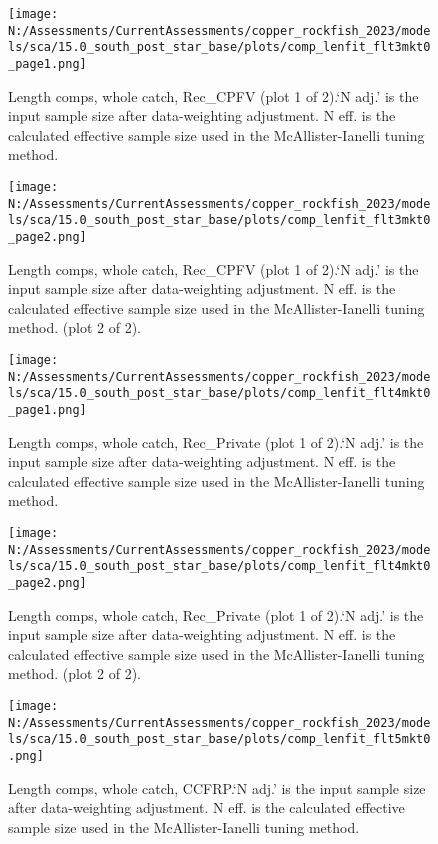 \documentclass[11pt,
  english,
  letterpaper,
]{article}
\begin{document}
\begin{figure}
\centering
\texttt{[image: N:/Assessments/CurrentAssessments/copper\_rockfish\_2023/models/sca/15.0\_south\_post\_star\_base/plots/comp\_lenfit\_flt3mkt0\_page1.png]}
\caption{Length comps, whole catch, Rec\_CPFV (plot 1 of 2).`N adj.' is the input sample size after data-weighting adjustment. N eff. is the calculated effective sample size used in the McAllister-Ianelli tuning method.\label{fig:comp_lenfit_flt3mkt0_page1}}
\end{figure}

\begin{figure}
\centering
\texttt{[image: N:/Assessments/CurrentAssessments/copper\_rockfish\_2023/models/sca/15.0\_south\_post\_star\_base/plots/comp\_lenfit\_flt3mkt0\_page2.png]}
\caption{Length comps, whole catch, Rec\_CPFV (plot 1 of 2).`N adj.' is the input sample size after data-weighting adjustment. N eff. is the calculated effective sample size used in the McAllister-Ianelli tuning method. (plot 2 of 2).\label{fig:comp_lenfit_flt3mkt0_page2}}
\end{figure}

\begin{figure}
\centering
\texttt{[image: N:/Assessments/CurrentAssessments/copper\_rockfish\_2023/models/sca/15.0\_south\_post\_star\_base/plots/comp\_lenfit\_flt4mkt0\_page1.png]}
\caption{Length comps, whole catch, Rec\_Private (plot 1 of 2).`N adj.' is the input sample size after data-weighting adjustment. N eff. is the calculated effective sample size used in the McAllister-Ianelli tuning method.\label{fig:comp_lenfit_flt4mkt0_page1}}
\end{figure}

\begin{figure}
\centering
\texttt{[image: N:/Assessments/CurrentAssessments/copper\_rockfish\_2023/models/sca/15.0\_south\_post\_star\_base/plots/comp\_lenfit\_flt4mkt0\_page2.png]}
\caption{Length comps, whole catch, Rec\_Private (plot 1 of 2).`N adj.' is the input sample size after data-weighting adjustment. N eff. is the calculated effective sample size used in the McAllister-Ianelli tuning method. (plot 2 of 2).\label{fig:comp_lenfit_flt4mkt0_page2}}
\end{figure}

\begin{figure}
\centering
\texttt{[image: N:/Assessments/CurrentAssessments/copper\_rockfish\_2023/models/sca/15.0\_south\_post\_star\_base/plots/comp\_lenfit\_flt5mkt0.png]}
\caption{Length comps, whole catch, CCFRP.`N adj.' is the input sample size after data-weighting adjustment. N eff. is the calculated effective sample size used in the McAllister-Ianelli tuning method.\label{fig:comp_lenfit_flt5mkt0}}
\end{figure}
\end{document}
